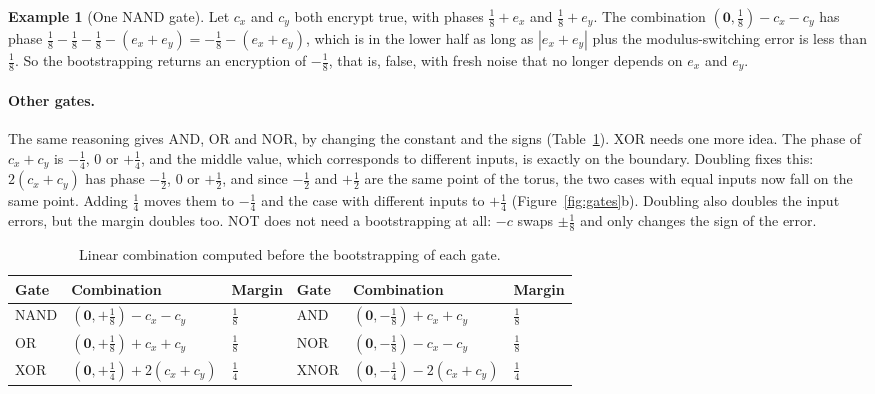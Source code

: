 \documentclass[12pt]{article}
\theoremstyle{plain}
\theoremstyle{definition}
\newtheorem{example}{Example}
\begin{document}
\begin{example}[One NAND gate]
Let $c_x$ and $c_y$ both encrypt \textsf{true}, with phases $\frac18+e_x$ and
$\frac18+e_y$. The combination $(\mathbf0,\frac18)-c_x-c_y$ has phase
$\frac18-\frac18-\frac18-(e_x+e_y)=-\frac18-(e_x+e_y)$, which is in the lower half
as long as $|e_x+e_y|$ plus the modulus-switching error is less than $\frac18$.
So the bootstrapping returns an encryption of $-\frac18$, that is,
\textsf{false}, with fresh noise that no longer depends on $e_x$ and $e_y$.
\end{example}

\paragraph{Other gates.}
The same reasoning gives AND, OR and NOR, by changing the constant and the
signs (Table~\ref{tab:gates}). XOR needs one more idea. The phase of $c_x+c_y$
is $-\frac14$, $0$ or $+\frac14$, and the middle value, which corresponds to
different inputs, is exactly on the boundary. Doubling fixes this: $2(c_x+c_y)$
has phase $-\frac12$, $0$ or $+\frac12$, and since $-\frac12$ and $+\frac12$ are
the same point of the torus, the two cases with equal inputs now fall on the
same point. Adding $\frac14$ moves them to $-\frac14$ and the case with different
inputs to $+\frac14$ (Figure~\ref{fig:gates}b). Doubling also doubles the input
errors, but the margin doubles too. NOT does not need a bootstrapping at all:
$-c$ swaps $\pm\frac18$ and only changes the sign of the error.

\begin{table}[!htb]
\centering
\caption{Linear combination computed before the bootstrapping of each gate.}
\label{tab:gates}
\small
\renewcommand{\arraystretch}{1.35}
\begin{tabular}{@{}lll@{\qquad}lll@{}}
\toprule
Gate & Combination & Margin & Gate & Combination & Margin\\
\midrule
NAND & $(\mathbf{0},+\frac18)-c_x-c_y$ & $\frac18$ &
AND  & $(\mathbf{0},-\frac18)+c_x+c_y$ & $\frac18$\\[2pt]
OR   & $(\mathbf{0},+\frac18)+c_x+c_y$ & $\frac18$ &
NOR  & $(\mathbf{0},-\frac18)-c_x-c_y$ & $\frac18$\\[2pt]
XOR  & $(\mathbf{0},+\frac14)+2(c_x+c_y)$ & $\frac14$ &
XNOR & $(\mathbf{0},-\frac14)-2(c_x+c_y)$ & $\frac14$\\
\bottomrule
\end{tabular}
\end{table}
\end{document}
